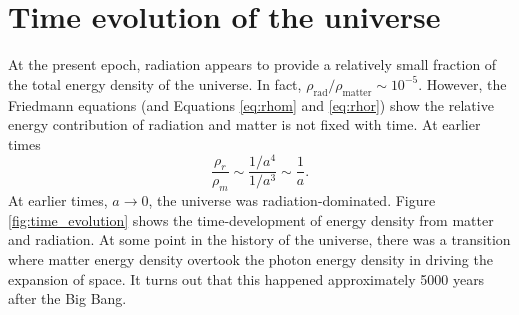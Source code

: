 \documentclass[a4paper,12pt]{article}
\theoremstyle{remark}
\newcommand{\mrm}[1]{\mathrm{#1}}
\renewcommand{\=}[1]{\stackrel{#1}{=}} %
\theoremstyle{plain}
\theoremstyle{definition}
\begin{document}
\section{Time evolution of the universe}
At the present epoch, radiation appears to provide a relatively small fraction of the total energy density of the universe. In fact, $\rho _\mrm{rad} /\rho _\mrm{matter} \sim 10 ^{-5}$. However, the Friedmann equations (and Equations \ref{eq:rhom} and \ref{eq:rhor}) show the relative energy contribution of radiation and matter is not fixed with time. At earlier times
\begin{equation}
\frac{\rho _r}{\rho _m} \sim \frac{1/a^{4}}{1/a^{3}} \sim \frac{1}{a}.
\end{equation}
At earlier times, $a \rightarrow 0$, the universe was radiation-dominated. Figure \ref{fig:time_evolution} shows the time-development of energy density from matter and radiation. At some point in the history of the universe, there was a transition where matter energy density overtook the photon energy density in driving the expansion of space. It turns out that this happened approximately 5000 years after the Big Bang. 

%


\end{document}
